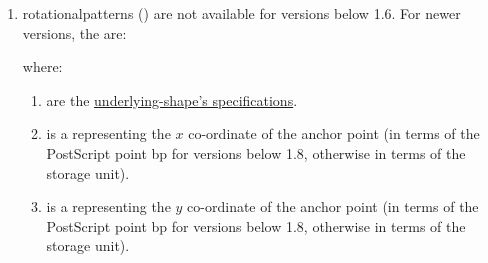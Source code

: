 \begin{numbered}
\begin{enumerate}
\begin{enumerate}
\begin{enumerate}
    \end{enumerate}

  \item The \glspl{co-ordinate} for the line of symmetry
     and
   are each stored as a  and are in
  terms of the PostScript point (\gls{bp}) for versions below 1.8
  otherwise are in terms of the storage unit.

  \item The  value  indicates if the
  shape is closed.

  \item If the shape is closed, the  
  indicates whether or not the starting control is anchored to the
  line of symmetry (true indicates the anchor setting is on).
  If the shape isn't closed, this value is omitted.

  \item If the  is false, the  is the information about the segment used to close the
  shape. This has the same syntax as for the
  \hyperref[jdr:joinsegment]{}. The 
  data is omitted if  is true.
  \end{enumerate}

  \item\label{jdr:rotational}%
  \Glspl{rotationalpattern} () are not available for versions below 1.6.
  For newer versions, the  are:
  \begin{syntaxline}
     
    
  \end{syntaxline}
  where:
  \begin{enumerate}
  \item {} are the \hyperref[jdr:composite]{underlying-shape's
    specifications}.

  \item {} is a  representing the
    $x$ \gls{co-ordinate} of the anchor point (in terms of the PostScript point
    \gls*{bp} for versions below 1.8, otherwise in terms of the
    storage unit).

  \item {} is a  representing the
    $y$ \gls{co-ordinate} of the anchor point (in terms of the PostScript point
    \gls*{bp} for versions below 1.8, otherwise in terms of the
    storage unit).


\end{enumerate}
\end{enumerate}
\end{numbered}
